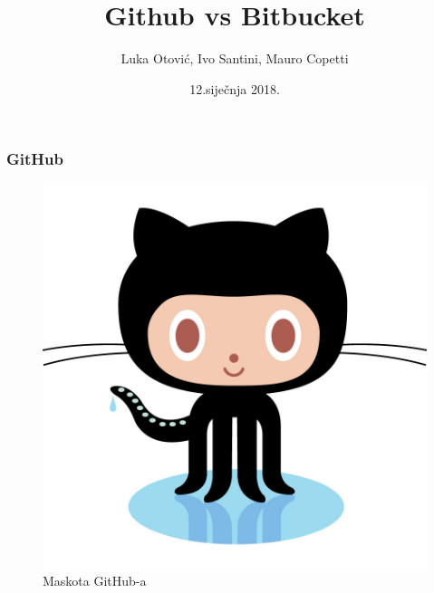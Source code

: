 \documentclass{beamer}
\title{Github vs Bitbucket}
\author{Luka Otović, Ivo Santini, Mauro Copetti}
\date{12.siječnja 2018.}
\institute{Tehnički fakultet Rijeka}
\begin{document}
	
	\frame{\titlepage}
	
	\begin{frame}                                         
		\frametitle{GitHub}



			
	\begin{figure}[h!]
		\begin{center}
			\includegraphics[scale=0.10]{macka.png}
			\caption{Maskota GitHub-a}
		\end{center}
	\end{figure}

	\end{frame}                  %
\end{document}
